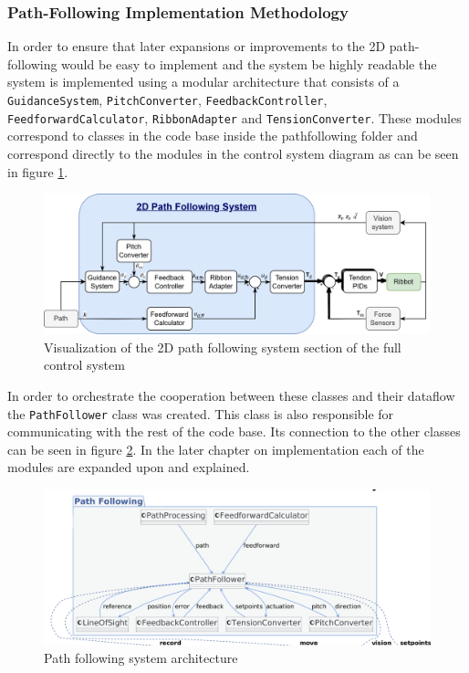 \subsubsection{Path-Following Implementation Methodology}
In order to ensure that later expansions or improvements to the 2D path-following would be easy to implement and the system be highly readable the  system is implemented using a modular architecture that consists of a \texttt{GuidanceSystem}, \texttt{PitchConverter}, \texttt{FeedbackController}, \texttt{FeedforwardCalculator}, \texttt{RibbonAdapter} and \texttt{TensionConverter}. These modules correspond to classes in the code base inside the pathfollowing folder and correspond directly to the modules in the control system diagram as can be seen in figure \ref{fig:2DpathfollowingSystemControlDiag}. 

\begin{figure} [H]
    \centering
    \includegraphics[width=\linewidth]{images/RibbotControl_2Dpathfollowing400p.png}
    \caption{Visualization of the 2D path following system section of the full control system}
    \label{fig:2DpathfollowingSystemControlDiag}
\end{figure}

In order to orchestrate the cooperation between these classes and their dataflow the \texttt{PathFollower} class was created. This class is also responsible for communicating with the rest of the code base. Its connection to the other classes can be seen in figure \ref{fig:pathfolloingmodules}.   In the later chapter on implementation each of the modules are expanded upon and explained.

\begin{figure}[H]
    \centering
    \includegraphics[width=\linewidth]{images/Software documentation/pathfollowingmodules.png}
    \caption{Path following system architecture}
    \label{fig:pathfolloingmodules}
\end{figure}



